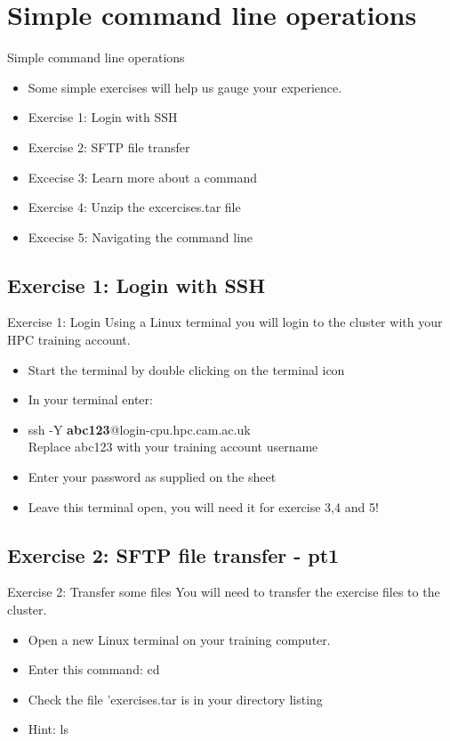 \section{Simple command line operations}
\begin{frame}{Simple command line operations}
\begin{itemize}
\item{Some simple exercises will help us gauge your experience.}
\item{Exercise 1: Login with SSH}
\item{Exercise 2: SFTP file transfer}
\item{Excecise 3: Learn more about a command}
\item{Exercise 4: Unzip the excercises.tar file}
\item{Excecise 5: Navigating the command line}
\end{itemize}
\end{frame}

\subsection{Exercise 1: Login with SSH}
\begin{frame}{Exercise 1: Login}
Using a Linux terminal you will login to the cluster with your HPC training account.
\begin{itemize}
\item{Start the terminal by double clicking on the terminal icon}
\item In your terminal enter:
\item{ssh -Y \textbf{abc123}@login-cpu.hpc.cam.ac.uk}\\
Replace abc123 with your training account username 
\item {Enter your password as supplied on the sheet}
\item{Leave this terminal open, you will need it for exercise 3,4 and 5!}
\end{itemize}
\end{frame}

\subsection{Exercise 2: SFTP file transfer - pt1}
\begin{frame}{Exercise 2: Transfer some files}
You will need to transfer the exercise files to the cluster.
\begin{itemize}
\item{Open a new Linux terminal on your training computer.}
\item{Enter this command: cd \alert{\footnotesize {}}}
\item{Check the file 'exercises.tar is in your directory listing}
\item{Hint: ls}
\end{itemize}
\end{frame}

